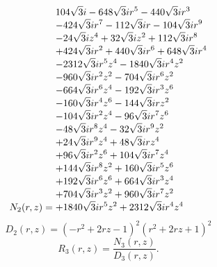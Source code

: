 \documentclass[11pt,a4paper]{article}
\begin{document}
\begin{equation}
N_{2}(r,z)=\shortstack[l]{$\displaystyle 104 \sqrt{3} i - 648 \sqrt{3} i r^{5} - 440 \sqrt{3} i r^{3}$\\
$\displaystyle  - 424 \sqrt{3} i r^{7} - 112 \sqrt{3} i r - 104 \sqrt{3} i r^{9}$\\
$\displaystyle  - 24 \sqrt{3} i z^{4} + 32 \sqrt{3} i z^{2} + 112 \sqrt{3} i r^{8}$\\
$\displaystyle  + 424 \sqrt{3} i r^{2} + 440 \sqrt{3} i r^{6} + 648 \sqrt{3} i r^{4}$\\
$\displaystyle  - 2312 \sqrt{3} i r^{5} z^{4} - 1840 \sqrt{3} i r^{4} z^{2}$\\
$\displaystyle  - 960 \sqrt{3} i r^{2} z^{2} - 704 \sqrt{3} i r^{6} z^{2}$\\
$\displaystyle  - 664 \sqrt{3} i r^{6} z^{4} - 192 \sqrt{3} i r^{3} z^{6}$\\
$\displaystyle  - 160 \sqrt{3} i r^{4} z^{6} - 144 \sqrt{3} i r z^{2}$\\
$\displaystyle  - 104 \sqrt{3} i r^{2} z^{4} - 96 \sqrt{3} i r^{7} z^{6}$\\
$\displaystyle  - 48 \sqrt{3} i r^{8} z^{4} - 32 \sqrt{3} i r^{9} z^{2}$\\
$\displaystyle  + 24 \sqrt{3} i r^{9} z^{4} + 48 \sqrt{3} i r z^{4}$\\
$\displaystyle  + 96 \sqrt{3} i r^{2} z^{6} + 104 \sqrt{3} i r^{7} z^{4}$\\
$\displaystyle  + 144 \sqrt{3} i r^{8} z^{2} + 160 \sqrt{3} i r^{5} z^{6}$\\
$\displaystyle  + 192 \sqrt{3} i r^{6} z^{6} + 664 \sqrt{3} i r^{3} z^{4}$\\
$\displaystyle  + 704 \sqrt{3} i r^{3} z^{2} + 960 \sqrt{3} i r^{7} z^{2}$\\
$\displaystyle  + 1840 \sqrt{3} i r^{5} z^{2} + 2312 \sqrt{3} i r^{4} z^{4}$}
\label{eq:cat-numerator-2}
\end{equation}
\begin{equation}
D_{2}(r,z)=\left(- r^{2} + 2 r z - 1\right)^{2} \left(r^{2} + 2 r z + 1\right)^{2}
\label{eq:cat-denominator-2}
\end{equation}
\begin{equation}
R_{3}(r,z)=\frac{N_{3}(r,z)}{D_{3}(r,z)}.
\label{eq:cat-rational-3}
\end{equation}
\end{document}
